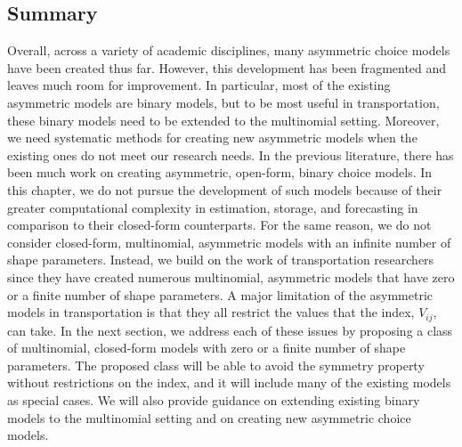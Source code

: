 \subsection{Summary}
\label{sec:lit_review_summary}
Overall, across a variety of academic disciplines, many asymmetric choice models have been created thus far. However, this development has been fragmented and leaves much room for improvement. In particular, most of the existing asymmetric models are binary models, but to be most useful in transportation, these binary models need to be extended to the multinomial setting. Moreover, we need systematic methods for creating new asymmetric models when the existing ones do not meet our research needs. In the previous literature, there has been much work on creating asymmetric, open-form, binary choice models. In this chapter, we do not pursue the development of such models because of their greater computational complexity in estimation, storage, and forecasting in comparison to their closed-form counterparts. For the same reason, we do not consider closed-form, multinomial, asymmetric models with an infinite number of shape parameters. Instead, we build on the work of transportation researchers since they have created numerous multinomial, asymmetric models that have zero or a finite number of shape parameters. A major limitation of the asymmetric models in transportation is that they all restrict the values that the index, $V_{ij}$, can take. In the next section, we address each of these issues by proposing a class of multinomial, closed-form models with zero or a finite number of shape parameters. The proposed class will be able to avoid the symmetry property without restrictions on the index, and it will include many of the existing models as special cases. We will also provide guidance on extending existing binary models to the multinomial setting and on creating new asymmetric choice models.


